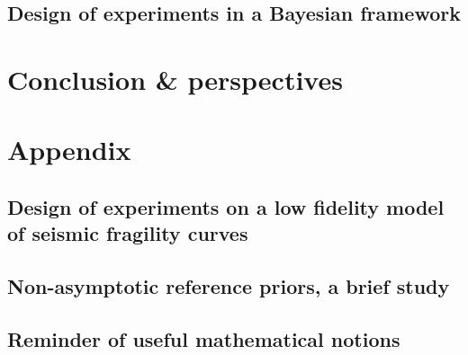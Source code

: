 \documentclass[a4paper]{book}
\renewcommand{\familydefault}{\sfdefault}
\begin{document}



\chapter{Design of experiments in a Bayesian framework}\label{chap:doe}






\part{Conclusion \& perspectives}\label{part:conclusion}


\appendix
\part*{Appendix}\label{part:appendix}


\chapter{Design of experiments on a low fidelity model of seismic fragility curves}\label{app:chap:ESAIM}




\chapter{Non-asymptotic reference priors, a brief study}



\chapter{Reminder of useful mathematical notions}

 
 
\printbibliography 
{}

\newpage
\pagestyle{empty}
\backmatter
\ \cleardoublepage
\ \newpage
\renewcommand{\familydefault}{\sfdefault}


 
\end{document}
